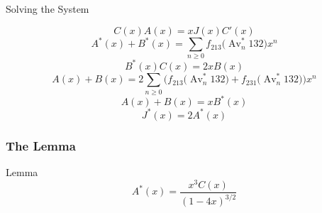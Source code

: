 \documentclass[xcolor=dvipsnames]{beamer}
\DeclareMathOperator{\Av}{Av}
\newcommand{\Avn}{\Av_n(123)}
\newcommand{\num}{f}
\begin{document}
% 


\begin{frame}{Solving the System}
  \begin{block}{}
    \pause
    $$ C(x) A(x)  = xJ(x) C'(x)$$
    $$ A^*(x) + B^*(x) = \sum_{n\geq 0} \num_{213} \big(\Av_n^* 132
    \big) x^n $$ 
    $$ B^*(x) C(x) = 2xB(x) $$
    $$ A(x)+B(x) = 2\sum_{n\geq 0} \Big(\num_{213} \big( \Av ^*_n
    132 \big) + \num_{231} \big( \Av ^*_n 132 \big)\Big) x^n $$
    $$ A(x) + B(x) = xB^*(x) $$
    $$ J^*(x)  = 2A^*(x) $$
  \end{block}
\end{frame}


\begin{frame} \frametitle{The Lemma}
\pause

  \begin{block}{Lemma}
    $$A^*(x) = \frac{x^3C(x)}{(1-4x)^{3/2}}$$
  \end{block}

\end{frame}
\end{document}
